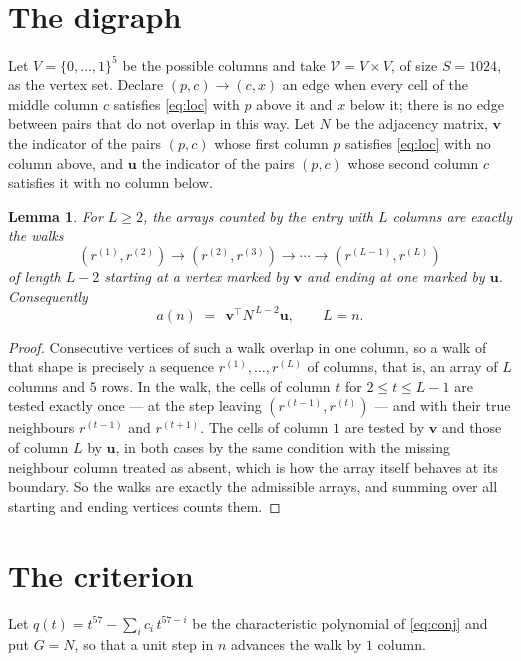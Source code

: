 \documentclass[11pt,a4paper]{article}
\theoremstyle{plain}
\newtheorem{lemma}[theorem]{Lemma}
\theoremstyle{definition}
\begin{document}
\section{The digraph}

Let $V=\{0,\dots,1\}^{5}$ be the possible columns and take
$\mathcal V=V\times V$, of size $S=1024$, as the vertex set. Declare $(p,c)\to(c,x)$ an edge
when every cell of the middle column $c$ satisfies \eqref{eq:loc} with $p$ above it and $x$
below it; there is no edge between pairs that do not overlap in this way. Let $N$ be the
adjacency matrix, $\mathbf{v}$ the indicator of the pairs $(p,c)$ whose first column $p$
satisfies \eqref{eq:loc} with no column above, and $\mathbf{u}$ the indicator of
the pairs $(p,c)$ whose second column $c$ satisfies it with no column below.

\begin{lemma}\label{lem:walk}
For $L\ge2$, the arrays counted by the entry with $L$ columns are exactly the walks
\[
(r^{(1)},r^{(2)})\to(r^{(2)},r^{(3)})\to\cdots\to(r^{(L-1)},r^{(L)})
\]
of length $L-2$ starting at a vertex marked by $\mathbf{v}$ and ending at one marked by
$\mathbf{u}$. Consequently
\[
a(n)\;=\;\,\mathbf{v}^{\!\top}N^{\,L-2}\mathbf{u},\qquad L=n .
\]
\end{lemma}

\begin{proof}
Consecutive vertices of such a walk overlap in one column, so a walk of that shape is
precisely a sequence $r^{(1)},\dots,r^{(L)}$ of columns, that is, an array of $L$ columns
and $5$ rows. In the walk, the cells of column $t$ for $2\le t\le L-1$ are tested
exactly once --- at the step leaving $(r^{(t-1)},r^{(t)})$ --- and with their true
neighbours $r^{(t-1)}$ and $r^{(t+1)}$. The cells of column $1$ are tested by
$\mathbf{v}$ and those of column $L$ by $\mathbf{u}$, in both cases by the same condition
with the missing neighbour column treated as absent, which is how the array itself behaves at
its boundary. So the walks are exactly the admissible arrays, and summing over all starting
and ending vertices counts them.
\end{proof}

\section{The criterion}

Let $q(t)=t^{57}-\sum_i c_i\,t^{57-i}$ be the characteristic polynomial of
\eqref{eq:conj} and put $G=N$, so that a unit step in $n$ advances the walk by
$1$ column.
\end{document}
